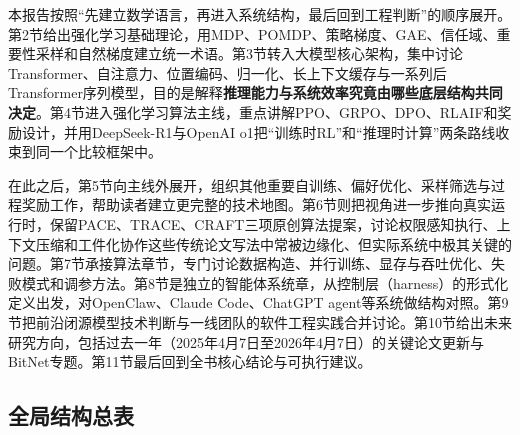 \documentclass[12pt,a4paper]{article}
\begin{document}
本报告按照“先建立数学语言，再进入系统结构，最后回到工程判断”的顺序展开。第2节给出强化学习基础理论，用MDP、POMDP、策略梯度、GAE、信任域、重要性采样和自然梯度建立统一术语。第3节转入大模型核心架构，集中讨论Transformer、自注意力、位置编码、归一化、长上下文缓存与一系列后Transformer序列模型，目的是解释\textbf{推理能力与系统效率究竟由哪些底层结构共同决定}。第4节进入强化学习算法主线，重点讲解PPO、GRPO、DPO、RLAIF和奖励设计，并用DeepSeek-R1与OpenAI o1把“训练时RL”和“推理时计算”两条路线收束到同一个比较框架中。

在此之后，第5节向主线外展开，组织其他重要自训练、偏好优化、采样筛选与过程奖励工作，帮助读者建立更完整的技术地图。第6节则把视角进一步推向真实运行时，保留PACE、TRACE、CRAFT三项原创算法提案，讨论权限感知执行、上下文压缩和工件化协作这些传统论文写法中常被边缘化、但实际系统中极其关键的问题。第7节承接算法章节，专门讨论数据构造、并行训练、显存与吞吐优化、失败模式和调参方法。第8节是独立的智能体系统章，从控制层（harness）的形式化定义出发，对OpenClaw、Claude Code、ChatGPT agent等系统做结构对照。第9节把前沿闭源模型技术判断与一线团队的软件工程实践合并讨论。第10节给出未来研究方向，包括过去一年（2025年4月7日至2026年4月7日）的关键论文更新与BitNet专题。第11节最后回到全书核心结论与可执行建议。

\subsection{全局结构总表}
\end{document}
